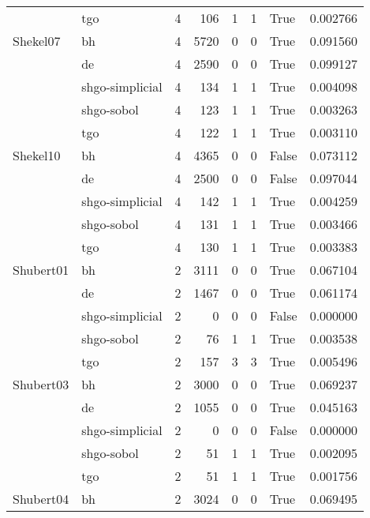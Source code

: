 \begin{longtable}{llrrrrlr}
         & tgo &     4 &      106 &      1 &       1 &    True &    0.002766 \\
Shekel07 & bh &     4 &     5720 &      0 &       0 &    True &    0.091560 \\
         & de &     4 &     2590 &      0 &       0 &    True &    0.099127 \\
         & shgo-simplicial &     4 &      134 &      1 &       1 &    True &    0.004098 \\
         & shgo-sobol &     4 &      123 &      1 &       1 &    True &    0.003263 \\
         & tgo &     4 &      122 &      1 &       1 &    True &    0.003110 \\
Shekel10 & bh &     4 &     4365 &      0 &       0 &   False &    0.073112 \\
         & de &     4 &     2500 &      0 &       0 &   False &    0.097044 \\
         & shgo-simplicial &     4 &      142 &      1 &       1 &    True &    0.004259 \\
         & shgo-sobol &     4 &      131 &      1 &       1 &    True &    0.003466 \\
         & tgo &     4 &      130 &      1 &       1 &    True &    0.003383 \\
Shubert01 & bh &     2 &     3111 &      0 &       0 &    True &    0.067104 \\
         & de &     2 &     1467 &      0 &       0 &    True &    0.061174 \\
         & shgo-simplicial &     2 &        0 &      0 &       0 &   False &    0.000000 \\
         & shgo-sobol &     2 &       76 &      1 &       1 &    True &    0.003538 \\
         & tgo &     2 &      157 &      3 &       3 &    True &    0.005496 \\
Shubert03 & bh &     2 &     3000 &      0 &       0 &    True &    0.069237 \\
         & de &     2 &     1055 &      0 &       0 &    True &    0.045163 \\
         & shgo-simplicial &     2 &        0 &      0 &       0 &   False &    0.000000 \\
         & shgo-sobol &     2 &       51 &      1 &       1 &    True &    0.002095 \\
         & tgo &     2 &       51 &      1 &       1 &    True &    0.001756 \\
Shubert04 & bh &     2 &     3024 &      0 &       0 &    True &    0.069495 \\

\end{longtable}

